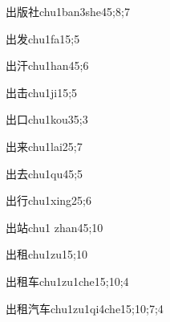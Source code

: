 \begin{verbete}{出版社}{chu1ban3she4}{5;8;7}
\end{verbete}

\begin{verbete}{出发}{chu1fa1}{5;5}
\end{verbete}

\begin{verbete}{出汗}{chu1han4}{5;6}
\end{verbete}

\begin{verbete}{出击}{chu1ji1}{5;5}
\end{verbete}

\begin{verbete}{出口}{chu1kou3}{5;3}
\end{verbete}

\begin{verbete}{出来}{chu1lai2}{5;7}
\end{verbete}

\begin{verbete}{出去}{chu1qu4}{5;5}
\end{verbete}

\begin{verbete}{出行}{chu1xing2}{5;6}
\end{verbete}

\begin{verbete}{出站}{chu1 zhan4}{5;10}
\end{verbete}

\begin{verbete}{出租}{chu1zu1}{5;10}
\end{verbete}

\begin{verbete}{出租车}{chu1zu1che1}{5;10;4}
\end{verbete}

\begin{verbete}{出租汽车}{chu1zu1qi4che1}{5;10;7;4}
\end{verbete}

